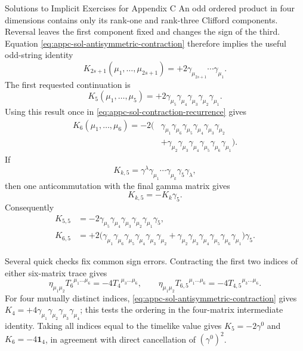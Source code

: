 \begin{bankssolutions}{Solutions to Implicit Exercises for Appendix C}
An odd ordered product in four dimensions contains only its rank-one and
rank-three Clifford components.  Reversal leaves the first component
fixed and changes the sign of the third.  Equation
\eqref{eq:appc-sol-antisymmetric-contraction} therefore implies the useful
odd-string identity
\[
K_{2s+1}(\mu_1,\ldots,\mu_{2s+1})
 =+2\gamma_{\mu_{2s+1}}\cdots\gamma_{\mu_1}.
\]
The first requested continuation is
\[
K_5(\mu_1,\ldots,\mu_5)
 =+2\gamma_{\mu_5}\gamma_{\mu_4}\gamma_{\mu_3}
       \gamma_{\mu_2}\gamma_{\mu_1}.
\]
Using this result once in \eqref{eq:appc-sol-contraction-recurrence} gives
\begin{align*}
 K_6(\mu_1,\ldots,\mu_6)=-2\bigl(&
 \gamma_{\mu_1}\gamma_{\mu_6}\gamma_{\mu_5}\gamma_{\mu_4}
                 \gamma_{\mu_3}\gamma_{\mu_2}\\
 &+\gamma_{\mu_2}\gamma_{\mu_3}\gamma_{\mu_4}\gamma_{\mu_5}
                 \gamma_{\mu_6}\gamma_{\mu_1}\bigr).
\end{align*}
If
\[
 K_{k,5}=\gamma^\lambda\gamma_{\mu_1}\cdots\gamma_{\mu_k}
          \gamma_5\gamma_\lambda,
\]
then one anticommutation with the final gamma matrix gives
\[
 K_{k,5}=-K_k\gamma_5.
\]
Consequently
\begin{align*}
 K_{5,5}&=-2\gamma_{\mu_5}\gamma_{\mu_4}\gamma_{\mu_3}
              \gamma_{\mu_2}\gamma_{\mu_1}\gamma_5,\\
 K_{6,5}&=+2\bigl(
 \gamma_{\mu_1}\gamma_{\mu_6}\gamma_{\mu_5}\gamma_{\mu_4}
                 \gamma_{\mu_3}\gamma_{\mu_2}
 +\gamma_{\mu_2}\gamma_{\mu_3}\gamma_{\mu_4}\gamma_{\mu_5}
                 \gamma_{\mu_6}\gamma_{\mu_1}\bigr)\gamma_5.
\end{align*}

Several quick checks fix common sign errors.  Contracting the first two
indices of either six-matrix trace gives
\[
 \eta_{\mu_1\mu_2}T_6{}^{\mu_1\ldots\mu_6}=-4T_4{}^{\mu_3\ldots\mu_6},
 \qquad
 \eta_{\mu_1\mu_2}T_{6,5}{}^{\mu_1\ldots\mu_6}
 =-4T_{4,5}{}^{\mu_3\ldots\mu_6}.
\]
For four mutually distinct indices,
\eqref{eq:appc-sol-antisymmetric-contraction} gives
$K_4=+4\gamma_{\mu_1}\gamma_{\mu_2}\gamma_{\mu_3}\gamma_{\mu_4}$;
this tests the ordering in the four-matrix intermediate identity.  Taking
all indices equal to the timelike value gives $K_5=-2\gamma^0$ and
$K_6=-4\mathbf 1_4$, in agreement with direct cancellation of
$(\gamma^0)^2$.

\end{bankssolutions}
